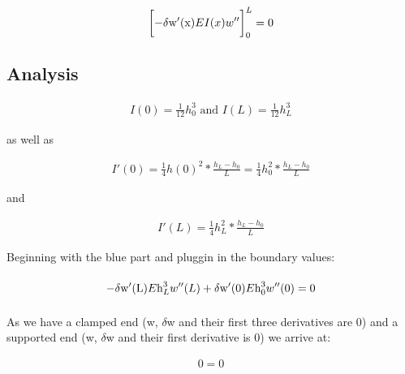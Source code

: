 \begin{equation}
    \begin{split}
        \left[-\mathrm{\delta w'(x)}\vphantom{\int}EI(x)w''\right]_0^L = 0
    \end{split}
\end{equation}

\subsection{Analysis}

\begin{equation}
    \begin{split}
        I(0) = \frac{1}{12}h_0^3 \text{ and } I(L) = \frac{1}{12}h_L^3
    \end{split}
\end{equation}

as well as

\begin{equation}
    \begin{split}
        I'(0) = \frac{1}{4}h(0)^2*\frac{h_L - h_0}{L} = \frac{1}{4}h_0^2*\frac{h_L - h_0}{L}
    \end{split}
\end{equation}

and

\begin{equation}
    \begin{split}
        I'(L) = \frac{1}{4}h_L^2*\frac{h_L - h_0}{L}
    \end{split}
\end{equation}

Beginning with the blue part and pluggin in the boundary values:

\begin{equation}
    \begin{split}
        -\mathrm{\delta w'(L)}\vphantom{\int}E\text{h}_L^3w''(L) + \mathrm{\delta w'(0)}\vphantom{\int}E\text{h}_0^3w''(0) = 0
    \end{split}
\end{equation}

As we have a clamped end (w, $\delta$w and their first three derivatives are 0) and a supported end (w, $\delta$w and their first derivative is 0) we arrive at:

\begin{equation}
    \begin{split}
        0 = 0
    \end{split}
\end{equation}

